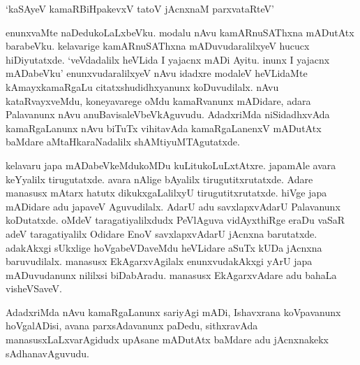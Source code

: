 \begin{shloka}
`kaSAyeV kamaRBiHpakevxV tatoV jAcnxnaM parxvataRteV'
\end{shloka}

enunxvaMte naDedukoLaLxbeVku. modalu nAvu kamARnuSAThxna mADutAtx barabeVku. kelavarige kamARnuSAThxna mADuvudaralilxyeV hucucx hiDiyutatxde. `veVdadalilx heVLida I yajacnx mADi Ayitu. inunx I yajacnx mADabeVku' enunxvudaralilxyeV nAvu idadxre modaleV heVLidaMte kAmayxkamaRgaLu citatxshudidhxyanunx koDuvudilalx. nAvu kataRvayxveMdu, koneyavarege oMdu kamaRvanunx mADidare, adara Palavanunx nAvu anuBavisaleVbeVkAguvudu. AdadxriMda niSidadhxvAda kamaRgaLanunx nAvu biTuTx vihitavAda kamaRgaLanenxV mADutAtx baMdare aMtaHkaraNadalilx shAMtiyuMTAgutatxde.

kelavaru japa mADabeVkeMdukoMDu kuLitukoLuLxtAtxre. japamAle avara keYyalilx tirugutatxde. avara nAlige bAyalilx tirugutitxrutatxde. Adare manasusx mAtarx hatutx dikukxgaLalilxyU tirugutitxrutatxde. hiVge japa mADidare adu japaveV Aguvudilalx. AdarU adu savxlapxvAdarU Palavanunx koDutatxde. oMdeV taragatiyalilxdudx PeVlAguva vidAyxthiRge eraDu vaSaR adeV taragatiyalilx Odidare EnoV savxlapxvAdarU jAcnxna barutatxde. adakAkxgi sUkxlige hoVgabeVDaveMdu heVLidare aSuTx kUDa jAcnxna baruvudilalx. manasusx EkAgarxvAgilalx enunxvudakAkxgi yArU japa mADuvudanunx nililxsi biDabAradu. manasusx EkAgarxvAdare adu bahaLa visheVSaveV.

AdadxriMda nAvu kamaRgaLanunx sariyAgi mADi, Ishavxrana koVpavanunx hoVgalADisi, avana parxsAdavanunx paDedu, sithxravAda manasusxLaLxvarAgidudx upAsane mADutAtx baMdare adu jAcnxnakekx sAdhanavAguvudu.
